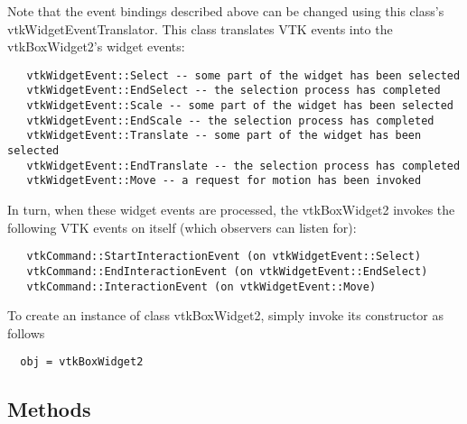  Note that the event bindings described above can be changed using this
 class's vtkWidgetEventTranslator. This class translates VTK events 
 into the vtkBoxWidget2's widget events:
 \begin{verbatim}
   vtkWidgetEvent::Select -- some part of the widget has been selected
   vtkWidgetEvent::EndSelect -- the selection process has completed
   vtkWidgetEvent::Scale -- some part of the widget has been selected
   vtkWidgetEvent::EndScale -- the selection process has completed
   vtkWidgetEvent::Translate -- some part of the widget has been selected
   vtkWidgetEvent::EndTranslate -- the selection process has completed
   vtkWidgetEvent::Move -- a request for motion has been invoked
 \end{verbatim}

 In turn, when these widget events are processed, the vtkBoxWidget2
 invokes the following VTK events on itself (which observers can listen for):
 \begin{verbatim}
   vtkCommand::StartInteractionEvent (on vtkWidgetEvent::Select)
   vtkCommand::EndInteractionEvent (on vtkWidgetEvent::EndSelect)
   vtkCommand::InteractionEvent (on vtkWidgetEvent::Move)
 \end{verbatim}

To create an instance of class vtkBoxWidget2, simply
invoke its constructor as follows
\begin{verbatim}
  obj = vtkBoxWidget2
\end{verbatim}
\subsection{Methods}

